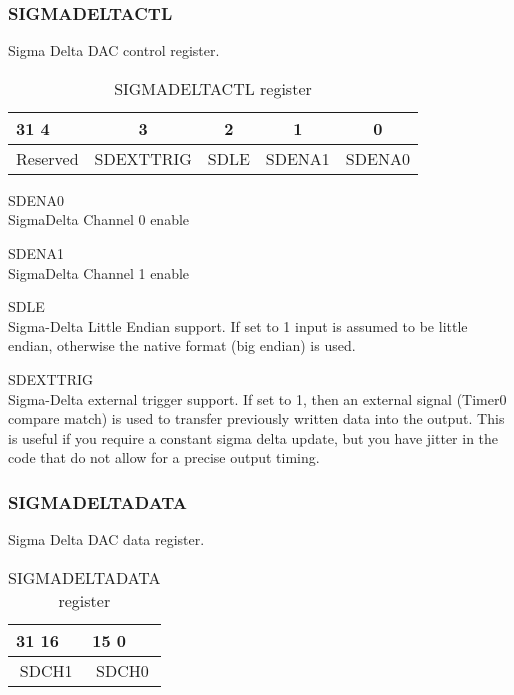 \subsubsection{SIGMADELTACTL}
Sigma Delta DAC control register.

\begin{table}[H]
\begin{center}
\begin{tabularx}{14cm}{Xcccc}
31 \hfill 4 & 3 & 2 & 1 & 0 \\

\hline
\multicolumn{1}{|c|}{Reserved} &
\multicolumn{1}{|c|}{SDEXTTRIG}  &
\multicolumn{1}{|c|}{SDLE}  &
\multicolumn{1}{|c|}{SDENA1}  &
\multicolumn{1}{|c|}{SDENA0}  \\

\hline
\end{tabularx}
\caption{SIGMADELTACTL register}
\end{center}
\end{table}

\begin{description}
\item{SDENA0} \hfill \\ SigmaDelta Channel 0 enable
\item{SDENA1} \hfill \\ SigmaDelta Channel 1 enable
\item{SDLE} \hfill \\ Sigma-Delta Little Endian support. If set to 1 input 
is assumed to be little endian, otherwise the native format (big endian) is used.
\item{SDEXTTRIG} \hfill \\ Sigma-Delta external trigger support. If set to 1, then an external signal (Timer0 compare match) is used to transfer previously
written data into the output. This is useful if you require a constant sigma delta update, but you have jitter in the code that do 
not allow for a precise output timing.
\end{description}


\subsubsection{SIGMADELTADATA}
Sigma Delta DAC data register.

\begin{table}[H]
\begin{center}
\begin{tabularx}{14cm}{XX}
31 \hfill 16 & 15 \hfill 0 \\

\hline
\multicolumn{1}{|c|}{SDCH1}  &
\multicolumn{1}{|c|}{SDCH0}  \\

\hline
\end{tabularx}
\caption{SIGMADELTADATA register}
\end{center}
\end{table}

